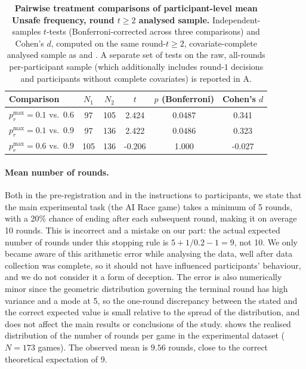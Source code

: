 \documentclass[pdflatex,sn-mathphys-ay]{sn-jnl}
\theoremstyle{thmstyleone}
\theoremstyle{thmstyletwo}
\theoremstyle{thmstylethree}
\begin{document}
\begin{table}[h]
\centering
\small
\caption{\textbf{Pairwise treatment comparisons of participant-level mean Unsafe frequency, round \(t\geq2\) analysed sample.} Independent-samples \(t\)-tests (Bonferroni-corrected across three comparisons) and Cohen's \(d\), computed on the same round-\(t\geq2\), covariate-complete analysed sample as  and . A separate set of tests on the raw, all-rounds per-participant sample (which additionally includes round-\(1\) decisions and participants without complete covariates) is reported in A.}
\label{tab:si:pairwise-comparisons}
\begin{tabular}{lccccc}
\toprule
Comparison & \(N_1\) & \(N_2\) & \(t\) & \(p\) (Bonferroni) & Cohen's \(d\) \\
\midrule
\(p_r^{\max}=0.1\) vs.\ \(0.6\) & 97 & 105 & 2.424 & 0.0487 & 0.341 \\
\(p_r^{\max}=0.1\) vs.\ \(0.9\) & 97 & 136 & 2.422 & 0.0486 & 0.323 \\
\(p_r^{\max}=0.6\) vs.\ \(0.9\) & 105 & 136 & -0.206 & 1.000 & -0.027 \\
\bottomrule
\end{tabular}
\end{table}

\paragraph{Mean number of rounds.} Both in the pre-registration and in the instructions to participants, we state that the main experimental task (the AI Race game) takes a minimum of 5 rounds, with a 20\% chance of ending after each subsequent round, making it on average 10 rounds. This is incorrect and a mistake on our part: the actual expected number of rounds under this stopping rule is \(5+1/0.2-1=9\), not 10. We only became aware of this arithmetic error while analysing the data, well after data collection was complete, so it should not have influenced participants' behaviour, and we do not consider it a form of deception. The error is also numerically minor since the geometric distribution governing the terminal round has high variance and a mode at 5, so the one-round discrepancy between the stated and the correct expected value is small relative to the spread of the distribution, and does not affect the main results or conclusions of the study.  shows the realised distribution of the number of rounds per game in the experimental dataset (\(N=173\) games). The observed mean is \(9.56\) rounds, close to the correct theoretical expectation of 9.
\end{document}
